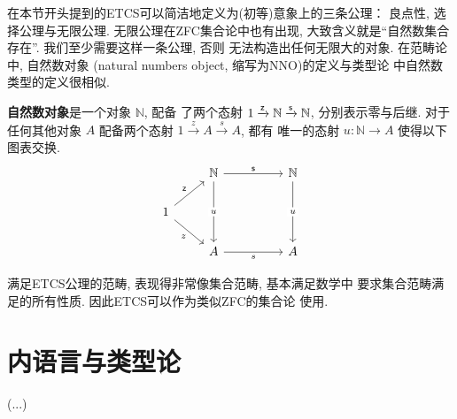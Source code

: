 在本节开头提到的ETCS可以简洁地定义为(初等)意象上的三条公理：
良点性, 选择公理与无限公理. 无限公理在ZFC集合论中也有出现,
大致含义就是“自然数集合存在”. 我们至少需要这样一条公理, 否则
无法构造出任何无限大的对象. 在范畴论中, 自然数对象
(natural numbers object, 缩写为NNO)的定义与类型论
中自然数类型的定义很相似.
\begin{definition}
\textbf{自然数对象}是一个对象 \(\mathbb N\), 配备
了两个态射 \(1 \xrightarrow{\textsf{z}} \mathbb N \xrightarrow{\textsf{s}} \mathbb N\),
分别表示零与后继. 对于任何其他对象 \(A\) 配备两个态射
\(1 \xrightarrow z A \xrightarrow s A\), 都有
唯一的态射 \(u : \mathbb N \to A\) 使得以下图表交换.
\[\begin{tikzcd}
& {\mathbb N} && {\mathbb N} \\
1 \\
& A && A
\arrow["z"', from=2-1, to=3-2]
\arrow["s"', from=3-2, to=3-4]
\arrow["{\cons{z}}", from=2-1, to=1-2]
\arrow["{\cons{s}}", from=1-2, to=1-4]
\arrow["u"{description}, from=1-2, to=3-2]
\arrow["u"{description}, from=1-4, to=3-4]
\end{tikzcd}\]
\end{definition}
满足ETCS公理的范畴, 表现得非常像集合范畴, 基本满足数学中
要求集合范畴满足的所有性质. 因此ETCS可以作为类似ZFC的集合论
使用.

\section{内语言与类型论}

(...)
